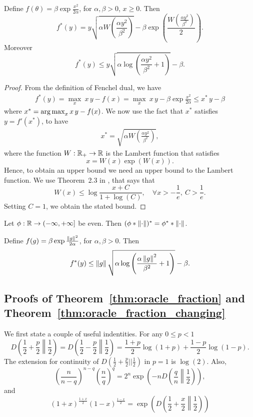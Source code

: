 \begin{lemma}
Define $f(\theta)= \beta \exp\frac{x^2}{2 \alpha}$, for $\alpha,\beta>0$, $x\geq0$. Then
\[
f^*(y)=y \sqrt{\alpha W\left(\frac{\alpha y^2}{\beta^2}\right)} - \beta \exp\left(\frac{W\left(\frac{\alpha y^2}{\beta^2}\right)}{2}\right).
\]
Moreover
\[
f^*(y) \leq y \sqrt{\alpha \log \left(\frac{\alpha y^2}{\beta^2} +1 \right)} - \beta.
\]
\end{lemma}
\begin{proof}
From the definition of Fenchel dual, we have
\begin{align*}
f^*(y)= \max_{x} \  x\, y - f(x) = \max_{x} \  x\, y - \beta \exp\frac{x^2}{2 \alpha} \leq x^*\,y -\beta
\end{align*}
where $x^*= \operatorname*{arg\,max}_{x} x\, y - f(x)$. We now use the fact that $x^*$ satisfies $y = f'(x^*)$, to have
\begin{align*}
x^*=\sqrt{\alpha W\left(\frac{\alpha y^2}{\beta^2}\right)},
\end{align*}
where the function $W:\mathbb{R}_+ \rightarrow \mathbb{R}$ is the Lambert function that satisfies
\[
x=W(x) \exp \left(W(x)\right).
\]
Hence, to obtain an upper bound we need an upper bound to the Lambert function.
We use Theorem~2.3 in \cite{hoorfar2008inequalities}, that says that
\[
W(x) \leq \log\frac{x+C}{1+\log(C)}, \quad \forall x> -\frac{1}{e}, \ C>\frac{1}{e}.
\]
Setting $C=1$, we obtain the stated bound.
\end{proof}

\begin{lemma}
Let $\phi:\mathbb{R} \rightarrow (-\infty, +\infty]$ be even. Then $(\phi \ast \left\|{\cdot}\right\|)^*=\phi^* \ast \left\|{\cdot}\right\|$.
\end{lemma}

\begin{cor}
Define $f(g)= \beta \exp\frac{\left\|{g}\right\|^2}{2 \alpha}$, for $\alpha,\beta>0$. Then
\[
f^*(y) \leq  \left\|{g}\right\| \sqrt{\alpha \log \left(\frac{\alpha \left\|{g}\right\|^2}{\beta^2} +1 \right)} - \beta.
\]
\end{cor}

\subsection{Proofs of Theorem~\ref{thm:oracle_fraction} and Theorem~\ref{thm:oracle_fraction_changing}}

We first state a couple of useful indentities.
For any $ 0\leq p < 1$
\[
D\left(\frac{1}{2}+\frac{p}{2}\middle\|\frac{1}{2}\right) = D\left(\frac{1}{2}-\frac{p}{2}\middle\|\frac{1}{2}\right)= \frac{1+p}{2} \log(1+p) + \frac{1-p}{2} \log(1-p).
\]
The extension for continuity of $D(\frac{1}{2}+\frac{p}{2}||\frac{1}{2})$ in $p=1$ is $\log(2)$.
Also,
\[
\left(\frac{n}{n-q}\right)^{n-q} \left(\frac{n}{q}\right)^{q} = 2^n \exp\left(-n D\left(\frac{q}{n}\middle\|\frac{1}{2}\right)\right),
\]
and
\begin{equation}
\label{eq:div_2}
\left(1+x\right)^\frac{1+x}{2} \left(1-x\right)^\frac{1-x}{2}= \exp\left( D\left(\frac{1}{2}+\frac{x}{2}\middle\|\frac{1}{2}\right) \right)
\end{equation}


